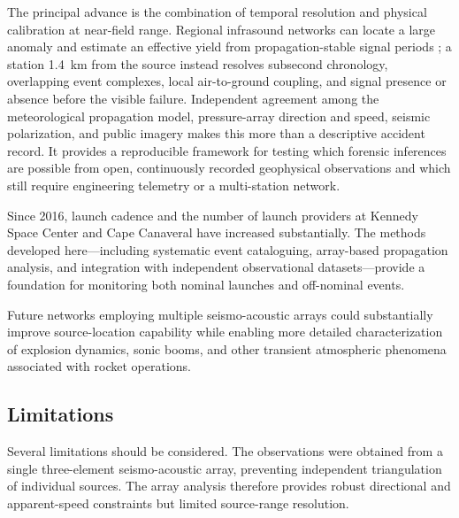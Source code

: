 \documentclass[]{seismica}
\begin{document}
The principal advance is the combination of temporal resolution and physical
calibration at near-field range. Regional infrasound networks can locate a
large anomaly and estimate an effective yield from propagation-stable signal
periods \citep{silber_scamfer_newglenn_2026}; a station 1.4~km from the source
instead resolves subsecond chronology, overlapping event complexes, local
air-to-ground coupling, and signal presence or absence before the visible
failure. Independent agreement among the meteorological propagation model,
pressure-array direction and speed, seismic polarization, and public imagery
makes this more than a descriptive accident record. It provides a reproducible
framework for testing which forensic inferences are possible from open,
continuously recorded geophysical observations and which still require
engineering telemetry or a multi-station network.

Since 2016, launch cadence and the number of launch providers at Kennedy Space Center and Cape Canaveral have increased substantially. The methods developed here---including systematic event cataloguing, array-based propagation analysis, and integration with independent observational datasets---provide a foundation for monitoring both nominal launches and off-nominal events.

Future networks employing multiple seismo-acoustic arrays could substantially improve source-location capability while enabling more detailed characterization of explosion dynamics, sonic booms, and other transient atmospheric phenomena associated with rocket operations.

\subsection{Limitations}
\label{sec:discussion_limitations}

Several limitations should be considered. The observations were obtained from a single three-element seismo-acoustic array, preventing independent triangulation of individual sources. The array analysis therefore provides robust directional and apparent-speed constraints but limited source-range resolution.

\end{document}
